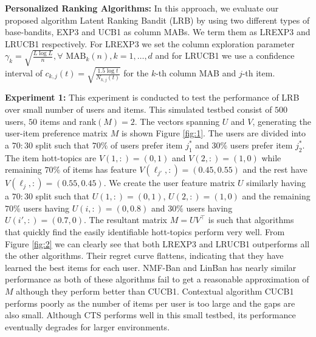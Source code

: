 \textbf{Personalized Ranking Algorithms:} In this approach, we evaluate our proposed algorithm Latent Ranking Bandit (LRB) by using two different types of base-bandits, EXP3 and UCB1 as column MABs.  We term them as LREXP3 and LRUCB1 respectively. For LREXP3 we set the column exploration parameter $\gamma_k = \sqrt{\frac{L \log L}{n}}, \forall \text{ MAB}_k(n), k = 1,\dots, d$ and for LRUCB1 we use  a confidence interval of $c_{k, j}(t) = \sqrt{\frac{1.5 \log t}{N_{k,j}(t)}}$ for the $k$-th column MAB and $j$-th item.

\textbf{Experiment 1:} This experiment is conducted to test the performance of LRB over  small number of users and items. This simulated testbed consist of $500$ users, $50$ items and rank$(M) = 2$. The vectors spanning $U$ and $V$, generating the user-item preference matrix $M$ is shown Figure \ref{fig:1}. The users are divided into a $70:30$ split such that $70\%$ of users prefer item $j^*_1$ and $30\%$ users prefer item  $j^*_2$. The item hott-topics are $V(1,:) = (0,1)$ and $V(2,:) = (1, 0)$ while remaining $70\%$ of items has feature $V(\ell_{j'},:) = (0.45, 0.55)$ and the rest have $V(\ell_{j},:) = (0.55, 0.45)$. We create the user feature matrix $U$ similarly having a $70:30$ split such that $U(1,:) = (0,1)$, $U(2,:) = (1,0)$ and the remaining $70\%$ users having $U(i,:) = (0,0.8)$ and $30\%$ users having $U(i',:) = (0.7,0)$. The resultant matrix $M =UV^{\intercal}$ is such that algorithms that quickly find the easily identifiable hott-topics perform very well. From Figure \ref{fig:2} we can clearly see that both LREXP3 and LRUCB1 outperforms all the other algorithms. Their regret curve flattens, indicating that they have learned the best items for each user.  NMF-Ban and LinBan has nearly similar performance as both of these algorithms fail to get a reasonable approximation of $M$ although they perform better than CUCB1. Contextual algorithm CUCB1 performs poorly as the number of items per user is too large and the gaps are also small. Although CTS performs well in this small testbed, its performance eventually degrades for larger environments. 


